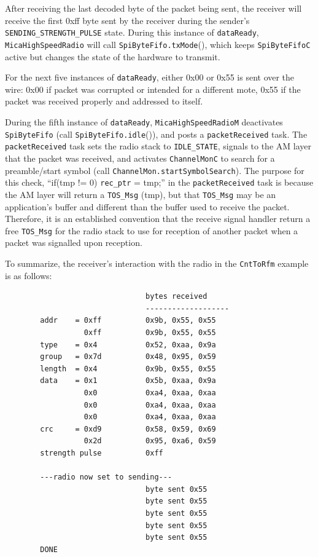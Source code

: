 \documentclass[11pt]{article}
\begin{document}
After receiving the last decoded byte of the packet being sent, the
receiver will receive the first 0xff byte sent by the receiver during
the sender's {\tt SENDING\_STRENGTH\_PULSE} state. During this instance of
{\tt dataReady}, {\tt MicaHighSpeedRadio} will call {\tt SpiByteFifo.txMode}(), which
keeps {\tt SpiByteFifoC} active but changes the state of the hardware to transmit.

For the next five instances of {\tt dataReady}, either 0x00 or 0x55 is sent
over the wire: 0x00 if packet was corrupted or intended for a
different mote, 0x55 if the packet was received properly and addressed
to itself.

During the fifth instance of {\tt dataReady}, {\tt MicaHighSpeedRadioM}
deactivates {\tt SpiByteFifo} (call {\tt SpiByteFifo.idle}()), and posts a
{\tt packetReceived} task. The {\tt packetReceived} task sets the radio stack to
{\tt IDLE\_STATE}, signals to the AM layer that the packet was received, and
activates {\tt ChannelMonC} to search for a preamble/start symbol (call
{\tt ChannelMon.startSymbolSearch}). The purpose for this check, ``if(tmp !=
0) {\tt rec\_ptr} = tmp;'' in the {\tt packetReceived} task is because the AM layer
will return a {\tt TOS\_Msg} (tmp), but that {\tt TOS\_Msg} may be an application's buffer
and different than the buffer used to receive the packet. Therefore,
it is an established convention that the receive signal handler return
a free {\tt TOS\_Msg} for the radio stack to use for reception of another
packet when a packet was signalled upon reception. 

To summarize, the receiver's interaction with the radio in the
{\tt CntToRfm} example is as follows:
\begin{verbatim}				
                                bytes received
                                -------------------
        addr    = 0xff          0x9b, 0x55, 0x55
                  0xff          0x9b, 0x55, 0x55
        type    = 0x4           0x52, 0xaa, 0x9a
        group   = 0x7d          0x48, 0x95, 0x59
        length 	= 0x4           0x9b, 0x55, 0x55
        data    = 0x1           0x5b, 0xaa, 0x9a
                  0x0           0xa4, 0xaa, 0xaa
                  0x0           0xa4, 0xaa, 0xaa
                  0x0           0xa4, 0xaa, 0xaa
        crc     = 0xd9          0x58, 0x59, 0x69
                  0x2d          0x95, 0xa6, 0x59
        strength pulse          0xff

        ---radio now set to sending---
                                byte sent 0x55
                                byte sent 0x55
                                byte sent 0x55
                                byte sent 0x55
                                byte sent 0x55
        DONE
\end{verbatim}
\end{document}
